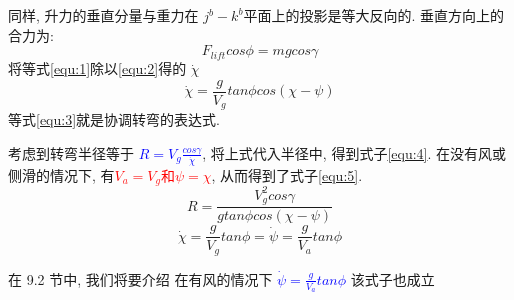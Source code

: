 \documentclass[UTF8,a4paper,10pt,nocolorlinks]{ctexart}
\begin{document}
    \par 同样, 升力的垂直分量与重力在 $j^{b} - k^{b}$平面上的投影是等大反向的. 
    垂直方向上的合力为:
    \begin{equation}
        F_{lift} cos \phi = mg cos\gamma
        \label{equ:2}
    \end{equation}
    将等式\ref{equ:1}除以\ref{equ:2}得的 $\dot{\chi}$
    \begin{equation}
        \dot{\chi} = \frac{g}{V_{g}} tan \phi cos(\chi - \psi)
        \label{equ:3}
    \end{equation}
    等式\ref{equ:3}就是协调转弯的表达式. 
    \par 考虑到转弯半径等于 \textcolor{blue}{ $R = V_{g} \frac{cos \gamma}{\dot{\chi}}$}, 将上式代入半径中, 得到式子\ref{equ:4}. 在没有风或侧滑的情况下, 有\textcolor{red}{$V_{a} = V_{g}$和$\psi = \chi$}, 从而得到了式子\ref{equ:5}. 
    \begin{equation}
        R = \frac{V_{g}^{2} cos \gamma}{g tan \phi cos(\chi - \psi)} 
        \label{equ:4}
    \end{equation}
    \begin{equation}
        \dot{\chi} = \frac{g}{V_{g}} tan \phi = \dot{\psi} = \frac{g}{V_{a}} tan \phi
        \label{equ:5}
    \end{equation}
    \par 在 9.2 节中, 我们将要介绍 在有风的情况下 \textcolor{blue}{$ \dot{\psi} = \frac{g}{V_{a}} tan \phi$} 该式子也成立
    
\end{document}
